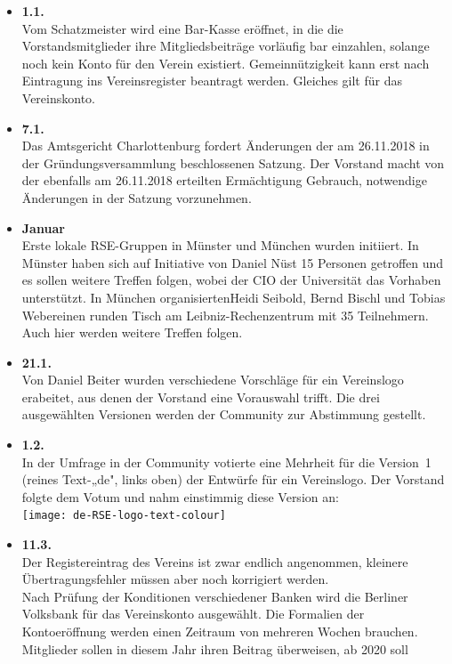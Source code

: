 \begin{itemize}
 \item \textbf{1.1.}\\
  Vom Schatzmeister wird eine Bar-Kasse eröffnet, in die die
  Vorstandsmitglieder ihre Mitgliedsbeiträge vorläufig bar einzahlen,
  solange noch kein Konto für den Verein existiert.
  Gemeinnützigkeit kann erst nach Eintragung ins Vereinsregister beantragt
  werden. Gleiches gilt für das Vereinskonto.
 \item \textbf{7.1.}\\
  Das Amtsgericht Charlottenburg fordert Änderungen der am 26.11.2018 in der
  Gründungsversammlung beschlossenen Satzung. Der
  Vorstand macht von der ebenfalls am 26.11.2018 erteilten Ermächtigung
  Gebrauch, notwendige Änderungen in der Satzung vorzunehmen.
 \item \textbf{Januar}\\
  Erste lokale RSE-Gruppen in Münster und München wurden initiiert. In Münster haben sich auf Initiative von Daniel Nüst 15 Personen getroffen und es sollen weitere
  Treffen folgen, wobei der CIO der Universität das Vorhaben unterstützt.
  In München organisiertenHeidi Seibold, Bernd Bischl und Tobias Webereinen runden Tisch am Leibniz-Rechenzentrum mit 35 Teilnehmern. Auch hier werden weitere Treffen folgen.
 \item \textbf{21.1.}\\
  Von Daniel Beiter wurden verschiedene Vorschläge für ein Vereinslogo erabeitet, aus denen der Vorstand eine Vorauswahl trifft.
  Die drei ausgewählten Versionen werden der Community zur
  Abstimmung gestellt.
 \item \textbf{1.2.}\\
  In der Umfrage in der Community votierte eine Mehrheit
  für die Version~1 (reines Text-„de", links oben) der Entwürfe für ein Vereinslogo.
  Der Vorstand folgte dem Votum und nahm einstimmig diese Version an:\\
  \texttt{[image: de-RSE-logo-text-colour]}
 \item \textbf{11.3.}\\
  Der Registereintrag des Vereins ist zwar endlich angenommen, kleinere Übertragungsfehler
  müssen aber noch korrigiert werden.\\
  Nach Prüfung der Konditionen verschiedener Banken wird die Berliner
  Volksbank für das Vereinskonto ausgewählt. Die Formalien der Kontoeröffnung werden
  einen Zeitraum von mehreren Wochen brauchen.\\
  Mitglieder sollen in diesem Jahr ihren Beitrag überweisen, ab 2020 soll

\end{itemize}
